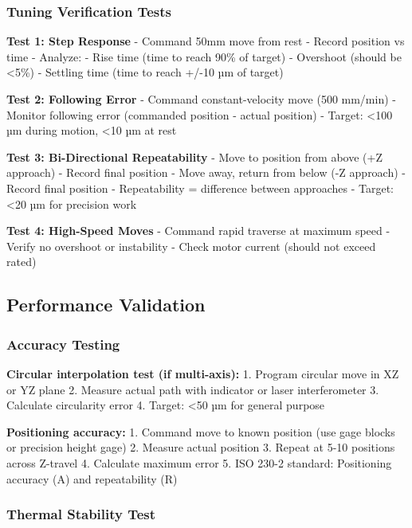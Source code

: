\documentclass[
]{article}
\begin{document}
\subsubsection{Tuning Verification
Tests}\label{tuning-verification-tests}

\textbf{Test 1: Step Response} - Command 50mm move from rest - Record
position vs time - Analyze: - Rise time (time to reach 90\% of target) -
Overshoot (should be \textless5\%) - Settling time (time to reach +/-10
µm of target)

\textbf{Test 2: Following Error} - Command constant-velocity move (500
mm/min) - Monitor following error (commanded position - actual position)
- Target: \textless100 µm during motion, \textless10 µm at rest

\textbf{Test 3: Bi-Directional Repeatability} - Move to position from
above (+Z approach) - Record final position - Move away, return from
below (-Z approach) - Record final position - Repeatability = difference
between approaches - Target: \textless20 µm for precision work

\textbf{Test 4: High-Speed Moves} - Command rapid traverse at maximum
speed - Verify no overshoot or instability - Check motor current (should
not exceed rated)

\subsection{Performance Validation}\label{performance-validation}

\subsubsection{Accuracy Testing}\label{accuracy-testing}

\textbf{Circular interpolation test (if multi-axis):} 1. Program
circular move in XZ or YZ plane 2. Measure actual path with indicator or
laser interferometer 3. Calculate circularity error 4. Target:
\textless50 µm for general purpose

\textbf{Positioning accuracy:} 1. Command move to known position (use
gage blocks or precision height gage) 2. Measure actual position 3.
Repeat at 5-10 positions across Z-travel 4. Calculate maximum error 5.
ISO 230-2 standard: Positioning accuracy (A) and repeatability (R)

\subsubsection{Thermal Stability Test}\label{thermal-stability-test}
\end{document}
